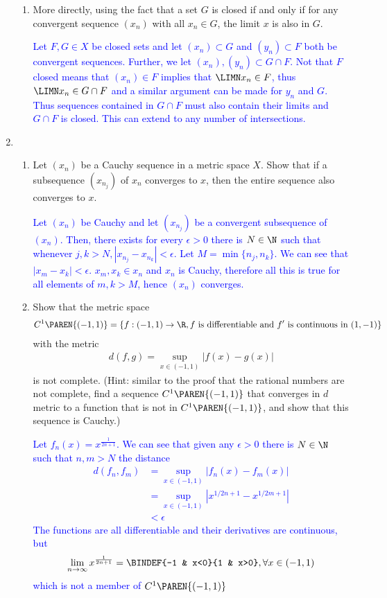 \documentclass[10pt,a4paper]{report}
\newcommand{\BLUE}[1]{\textcolor{blue}{#1}}
\begin{document}
\begin{enumerate}[label=\Roman*.]
\begin{enumerate}[label=(\alph*)]
		\item More directly, using the fact that a set $G$ is closed if and only if for any convergent sequence $(x_n)$ with all $x_n \in G$, the limit $x$ is also in $G$.
		
		\BLUE{Let $F, G \in X$ be closed sets and let $(x_n) \subset G$ and $(y_n) \subset F$ both be convergent sequences. Further, we let $(x_n), (y_n) \subset G\cap F$. Not that $F$ closed means that $(x_n) \in F$ implies that $\LIMN x_n \in F$, thus $\LIMN x_n \in G \cap F$ and a similar argument can be made for $y_n$ and $G$.  Thus sequences contained in $G\cap F$ must also contain their limits and $G\cap F$ is closed.  This can extend to any number of intersections.
		}
	\end{enumerate}
	
	\item\begin{enumerate}[label=(\alph*)]
		\item Let $(x_n)$ be a Cauchy sequence in a metric space $X$.  Show that if a subsequence $(x_{n_j})$ of $x_n$ converges to $x$, then the entire sequence also converges to $x$.
		
		\BLUE{Let $(x_n)$ be Cauchy and let $(x_{n_j})$ be a convergent subsequence of $(x_n)$.  Then, there exists for every $\epsilon > 0$ there is $N \in \N$ such that whenever $j,k > N, |x_{n_j} - x_{n_k} | < \epsilon$.  Let $M = \min\{n_j, n_k\}$.  We can see that $|x_m-x_k| < \epsilon$.  $x_m, x_k \in x_n$ and $x_n$ is Cauchy, therefore all this is true for all elements of $m,k >M$, hence $(x_n)$ converges.
		}
		\item Show that the metric space
		\begin{align*}
			C^1\PAREN{(-1,1)}=\{f:(-1,1)\to\R, f \text{ is differentiable and }f'\text{ is continuous in }(1,-1)\}
		\end{align*}with the metric
		\begin{align*}
			d(f,g) = \sup_{x\in (-1,1)} |f(x)-g(x)|
		\end{align*}is not complete.  (Hint: similar to the proof that the rational numbers are not complete, find a sequence $C^1\PAREN{(-1,1)}$ that converges in $d$ metric to a function that is not in $C^1\PAREN{(-1,1)}$, and show that this sequence is Cauchy.)
		
		\BLUE{Let $f_n(x) = x^{\frac{1}{2n+1}}$. We can see that given any $\epsilon > 0$ there is $N \in \N$ such that $n,m >N$ the distance 
		\begin{align*}
			d(f_n,f_m)&=\sup_{x\in (-1,1)} |f_n(x)-f_m(x)| \\
			&=\sup_{x\in (-1,1)} |x^{1/2n+1}-x^{1/2m+1}| \\
		 	&< \epsilon
		\end{align*}The functions are all differentiable and their derivatives are continuous, but
		\begin{align*}
				\lim_{n\to\infty} x^{\frac{1}{2n+1}} = \BINDEF{-1 & x<0}{1 & x>0}, \forall x \in (-1,1)
		\end{align*}which is not a member of $C^1\PAREN{(-1,1)}$
		}
	\end{enumerate}
	

\end{enumerate}
\end{document}
